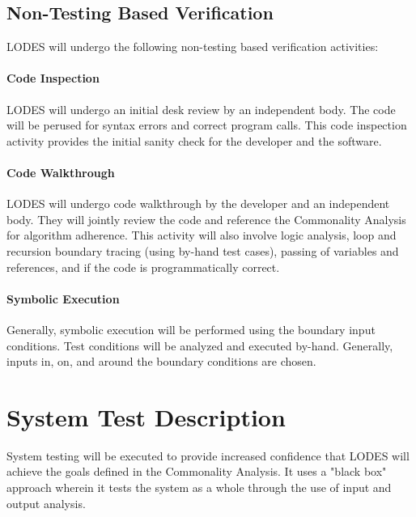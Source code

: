 \documentclass[12pt, titlepage]{article}
\newcommand{\famname}{LODES} %
\begin{document}

\subsection{Non-Testing Based Verification}
\famname{} will undergo the following non-testing based verification activities:

\paragraph{Code Inspection\\}
\famname{} will undergo an initial desk review by an independent body.
The code will be perused for syntax errors and correct program calls.
This code inspection activity provides the initial sanity check for the developer and the software.

\paragraph{Code Walkthrough\\}
\famname{} will undergo code walkthrough by the developer and an independent body.
They will jointly review the code and reference the Commonality Analysis for algorithm adherence. This activity
will also involve logic analysis, loop and recursion boundary tracing (using by-hand test cases), passing of
variables and references, and if the code is programmatically correct.

\paragraph{Symbolic Execution\\}
Generally, symbolic execution will be performed using the boundary input conditions. Test conditions will be
analyzed and executed by-hand. Generally, inputs in, on, and around the boundary conditions are chosen.


\section{System Test Description}
System testing will be executed to provide increased confidence that \famname{} will achieve the goals defined in the Commonality Analysis. It uses a "black box" approach wherein it tests the system as a whole through the use of input and output analysis.
\end{document}
